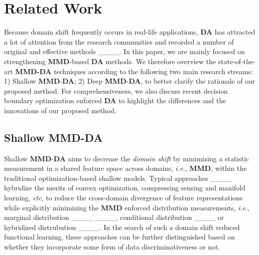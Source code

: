 \section{Related Work}
\label{Related Work}


Because domain shift frequently occurs in real-life applications,  \textbf{DA} has attracted a lot of attention from the research communities and recorded a number of original and  effective methods ____. In this paper, we are mainly focused  on strengthening  \textbf{MMD}-based \textbf{DA} methods. We therefore overview the state-of-the-art \textbf{MMD-DA} techniques according to  the following two main research streams: 1) Shallow \textbf{MMD}-\textbf{DA}; 2) Deep \textbf{MMD}-\textbf{DA}, to better clarify the rationale of our proposed method. For comprehensiveness, we also discuss recent decision boundary optimization enforced \textbf{DA} to highlight the differences and the innovations of our proposed method.







\subsection{Shallow \textbf{MMD}-\textbf{DA}}
\label{subsect: Shallow DA}


Shallow \textbf{MMD}-\textbf{DA} aims to decrease the  \textit{domain shift} by minimizing a statistic measurement in a shared feature space across domains, \textit{i.e.}, \textbf{MMD}, within the traditional optimization-based shallow models. Typical approaches ____ hybridize the merits of convex optimization, compressing sensing and manifold learning, \textit{etc}, to reduce the cross-domain divergence of feature representations while explicitly minimizing the \textbf{MMD} enforced distribution measurements, \textit{i.e.}, marginal distribution ____ ____, conditional distribution ____ or hybridized distrubution ____. In the search of such a domain shift reduced functional learning, these approaches can be further distinguished based on whether they incorporate some form of data discriminativeness or not.




